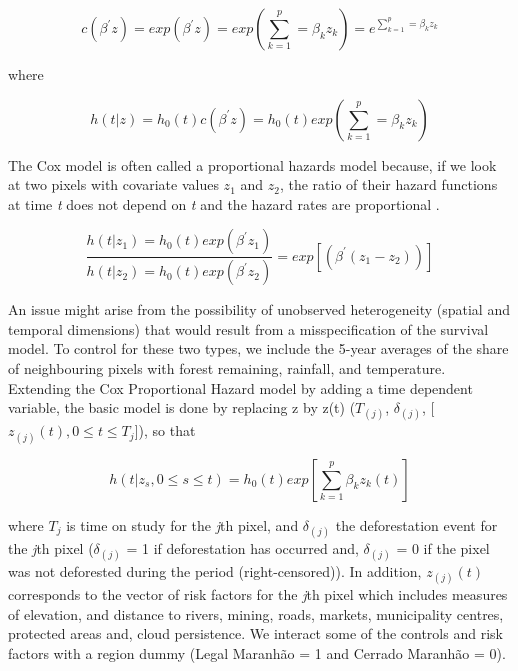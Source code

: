 \begin{center}
\begin{equation}
c(\beta^{'}z) = exp(\beta^{'}z) = exp(\sum^{p}_{k=1}=\beta_{k}z_{k}) = e^{\sum^{p}_{k=1}=\beta_{k}z_{k}}  \label{eq:5} 
\end{equation}
\end{center}

where 

\begin{center}
\begin{equation}
h(t|z) = h_{0}(t)c(\beta^{'}z) = h_{0}(t) exp(\sum^{p}_{k=1}=\beta_{k}z_{k}) \label{eq:6} 
\end{equation}
\end{center}

The Cox model is often called a proportional hazards model because, if we look at two pixels with covariate values $z_{1}$ and $z_{2}$, the ratio of their hazard functions at time \textit{t} does not depend on \textit{t} and the hazard rates are proportional \citep{cao_2005}.

\begin{center}
\begin{equation}
\frac{h(t|z_{1}) = h_{0}(t)exp(\beta^{'}z_{1})}{h(t|z_{2}) = h_{0}(t)exp(\beta^{'}z_{2})} = exp[(\beta^{'}(z_{1} - z_{2}))]  \label{eq:7} 
\end{equation}
\end{center}


An issue might arise from the possibility of unobserved heterogeneity (spatial and temporal dimensions) that would result from a misspecification of the survival model. To control for these two types, we include the 5-year averages of the share of neighbouring pixels with forest remaining, rainfall, and temperature. Extending the Cox Proportional Hazard model by adding a time dependent variable, the basic model is done by replacing z by z(t) ($T_{(j)}$, $\delta_{(j)}$, [$z_{(j)}(t), 0 \leq t \leq T_{j}$]), so that


\begin{center}
\begin{equation}
h(t|z_{s}, 0 \leq s \leq t) = h_{0}(t)exp[\sum^{p}_{k=1}\beta_{k}z_{k}(t)] \label{eq:8} 
\end{equation}
\end{center}

where $T_{j}$ is time on study for the \textit{j}th pixel, and $\delta_{(j)}$ the deforestation event for the \textit{j}th pixel ($\delta_{(j)}$ = 1 if deforestation has occurred and, $\delta_{(j)}$ = 0 if the pixel was not deforested during the period (right-censored)). In addition, $z_{(j)}(t)$ corresponds to the vector of risk factors for the  \textit{j}th pixel which includes measures of elevation, and distance to rivers, mining, roads, markets, municipality centres, protected areas and, cloud persistence. We interact some of the controls and risk factors with a region dummy (Legal Maranhão = 1 and Cerrado Maranhão = 0).

